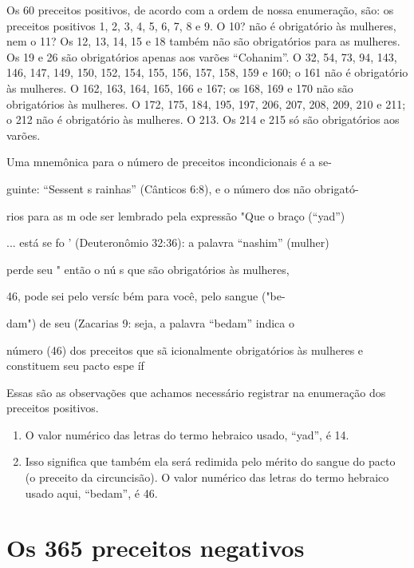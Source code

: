Os 60 preceitos positivos, de acordo com a ordem de nossa enume­ração,
são: os preceitos positivos 1, 2, 3, 4, 5, 6, 7, 8 e 9. O 10? não é
obrigató­rio às mulheres, nem o 11? Os 12, 13, 14, 15 e 18 também não
são obrigatórios para as mulheres. Os 19 e 26 são obrigatórios apenas
aos varões ``Cohanim''. O 32, 54, 73, 94, 143, 146, 147, 149, 150, 152,
154, 155, 156, 157, 158, 159 e 160; o 161 não é obrigatório às mulheres.
O 162, 163, 164, 165, 166 e 167; os 168, 169 e 170 não são obrigatórios
às mulheres. O 172, 175, 184, 195, 197, 206, 207, 208, 209, 210 e 211; o
212 não é obrigatório às mulheres. O 213. Os 214 e 215 só são
obrigatórios aos varões.


Uma mnemônica para o número de preceitos incondicionais é a se-


guinte: ``Sessent s rainhas'' (Cânticos 6:8), e o número dos não obrigató-

rios para as m ode ser lembrado pela expressão "Que o braço (``yad'')

... está se fo ' (Deuteronômio 32:36): a palavra ``nashim'' (mulher)

perde seu " então o nú s que são obrigatórios às mulheres,

46, pode sei pelo versíc bém para você, pelo sangue ("be-

dam") de seu (Zacarias 9: seja, a palavra ``bedam'' indica o

número (46) dos preceitos que sã icionalmente obrigatórios às mulheres
e constituem seu pacto espe íf

Essas são as observações que achamos necessário registrar na enu­meração
dos preceitos positivos.


\begin{enumerate}
\def\labelenumi{\arabic{enumi}.}
\setcounter{enumi}{230}
\item
 
 O valor numérico das letras do termo hebraico usado, ``yad'', é 14.
 
\item
 
 Isso significa que também ela será redimida pelo mérito do sangue do
 pacto (o preceito da circuncisão). O valor numérico das letras do
 termo hebraico usado aqui, ``bedam'', é 46.
 
\end{enumerate}


\part*{Os 365 preceitos negativos}



